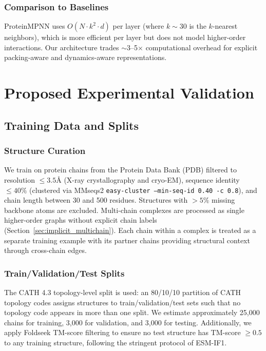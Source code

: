 \documentclass{article}
\begin{document}
\subsubsection{Comparison to Baselines}
ProteinMPNN uses $O(N \cdot k^2 \cdot d)$ per layer (where $k \sim 30$ is the $k$-nearest neighbors), which is more efficient per layer but does not model higher-order interactions. Our architecture trades $\sim$3--5$\times$ computational overhead for explicit packing-aware and dynamics-aware representations.

\section{Proposed Experimental Validation}

\subsection{Training Data and Splits}
\label{sec:data}

\subsubsection{Structure Curation}
We train on protein chains from the Protein Data Bank (PDB) filtered to resolution $\leq 3.5$\AA{} (X-ray crystallography and cryo-EM), sequence identity $\leq 40\%$ (clustered via MMseqs2 \texttt{easy-cluster --min-seq-id 0.40 -c 0.8}), and chain length between 30 and 500 residues. Structures with $>5\%$ missing backbone atoms are excluded. Multi-chain complexes are processed as single higher-order graphs without explicit chain labels (Section~\ref{sec:implicit_multichain}). Each chain within a complex is treated as a separate training example with its partner chains providing structural context through cross-chain edges.

\subsubsection{Train/Validation/Test Splits}
The CATH 4.3 topology-level split is used: an 80/10/10 partition of CATH topology codes assigns structures to train/validation/test sets such that no topology code appears in more than one split. We estimate approximately 25,000 chains for training, 3,000 for validation, and 3,000 for testing. Additionally, we apply Foldseek TM-score filtering to ensure no test structure has TM-score $\geq 0.5$ to any training structure, following the stringent protocol of ESM-IF1.
\end{document}
